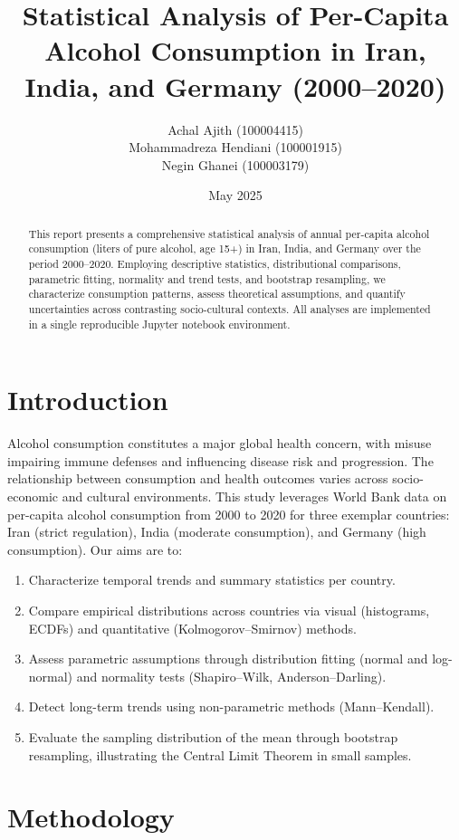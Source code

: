 \documentclass[12pt,a4paper]{article}
\title{Statistical Analysis of Per-Capita Alcohol Consumption in Iran, India, and Germany (2000--2020)}
\author{Achal Ajith (100004415) \\ Mohammadreza Hendiani (100001915) \\ Negin Ghanei (100003179)}
\date{May 2025}
\begin{document}
	\maketitle
	
	\begin{abstract}
		This report presents a comprehensive statistical analysis of annual per-capita alcohol consumption (liters of pure alcohol, age 15+) in Iran, India, and Germany over the period 2000--2020. Employing descriptive statistics, distributional comparisons, parametric fitting, normality and trend tests, and bootstrap resampling, we characterize consumption patterns, assess theoretical assumptions, and quantify uncertainties across contrasting socio-cultural contexts. All analyses are implemented in a single reproducible Jupyter notebook environment.
	\end{abstract}
	
	\section{Introduction}
	Alcohol consumption constitutes a major global health concern, with misuse impairing immune defenses and influencing disease risk and progression. The relationship between consumption and health outcomes varies across socio-economic and cultural environments. This study leverages World Bank data on per-capita alcohol consumption from 2000 to 2020 for three exemplar countries: Iran (strict regulation), India (moderate consumption), and Germany (high consumption). Our aims are to:
	\begin{enumerate}
		\item Characterize temporal trends and summary statistics per country.
		\item Compare empirical distributions across countries via visual (histograms, ECDFs) and quantitative (Kolmogorov--Smirnov) methods.
		\item Assess parametric assumptions through distribution fitting (normal and log-normal) and normality tests (Shapiro--Wilk, Anderson--Darling).
		\item Detect long-term trends using non-parametric methods (Mann--Kendall).
		\item Evaluate the sampling distribution of the mean through bootstrap resampling, illustrating the Central Limit Theorem in small samples.
	\end{enumerate}
	
	\section{Methodology}
\end{document}
